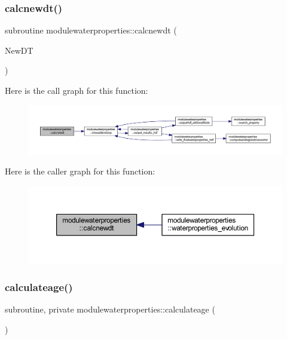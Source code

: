 \subsubsection{\texorpdfstring{calcnewdt()}{calcnewdt()}}
{\footnotesize\ttfamily subroutine modulewaterproperties\+::calcnewdt (\begin{DoxyParamCaption}\item[{type(t\+\_\+newdt)}]{New\+DT }\end{DoxyParamCaption})\hspace{0.3cm}{\ttfamily [private]}}

Here is the call graph for this function\+:\nopagebreak
\begin{figure}[H]
\begin{center}
\leavevmode
\includegraphics[width=350pt]{namespacemodulewaterproperties_a370617430ffb5b34448cfc27deca6c88_cgraph}
\end{center}
\end{figure}
Here is the caller graph for this function\+:\nopagebreak
\begin{figure}[H]
\begin{center}
\leavevmode
\includegraphics[width=350pt]{namespacemodulewaterproperties_a370617430ffb5b34448cfc27deca6c88_icgraph}
\end{center}
\end{figure}
\mbox{\label{namespacemodulewaterproperties_a93266e9cb4d7560fc55136ac596e1c35}} 
\subsubsection{\texorpdfstring{calculateage()}{calculateage()}}
{\footnotesize\ttfamily subroutine, private modulewaterproperties\+::calculateage (\begin{DoxyParamCaption}{ }\end{DoxyParamCaption})\hspace{0.3cm}{\ttfamily [private]}}

